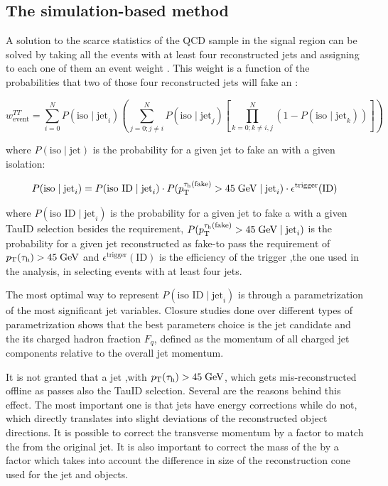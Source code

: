 \subsection{The simulation-based method}
\label{dihad:subsec:eventweight}
\FloatBarrier

A solution to the scarce statistics of the QCD sample in the signal region can be solved by taking all the events with at least four reconstructed jets and assigning to each one of them an event weight . This weight is a function of the probabilities that two of those four reconstructed jets will fake an \hadtau:

\begin{equation}
w^{TT}_{\text{event}} = \sum_{i=0}^{N}P(\text{iso}\mid \text{jet}_{i})\left(\sum_{j=0; j\neq i}^{N}P(\text{iso}\mid \text{jet}_{j})\left[\prod_{k=0; k\neq i,j}^{N}(1-P(\text{iso}\mid \text{jet}_{k}))\right]\right)
\end{equation}

where $P(\text{iso}\mid \text{jet})$ is the probability for a given jet to fake an \hadtau with a given isolation:

\begin{equation}
P(\text{iso}\mid \text{jet}_{i}) = P(\text{iso ID}\mid \text{jet}_{i}) \cdot P(p_{\text{T}}^{\tau_{\text{h}}(\text{fake})} > 45\;\text{Ge}\kern-0.06667em\text{V}\mid \text{jet}_{i}) \cdot  \epsilon^{\text{trigger}}(\text{ID})
\end{equation}

where $P(\text{iso ID}\mid \text{jet}_{i})$ is the probability for a given jet to fake a \hadtau with a given TauID selection besides the \pt requirement, $P(p_{\text{T}}^{\tau_{\text{h}}(\text{fake})} > 45\;\text{Ge}\kern-0.06667em\text{V}\mid \text{jet}_{i})$ is the probability for a given jet reconstructed as fake-\hadtau to pass the requirement of $p_{\text{T}}(\tau_{\text{h}})> 45\;\text{Ge}\kern-0.06667em\text{V}$ and $\epsilon^{\text{trigger}}(\text{ID})$ is the efficiency of the trigger ,the one used in the analysis, in selecting events with at least four jets.

The most optimal way to represent $P(\text{iso ID}\mid \text{jet}_{i})$ is through a parametrization of the most significant jet variables. Closure studies done over different types of parametrization shows that the best parameters choice is the jet candidate \pt and the its charged hadron fraction $F_{q}$, defined as the momentum of all charged jet components relative to the overall jet momentum.

It is not granted that a jet ,with $p_{\text{T}}(\tau_{\text{h}})> 45\;\text{Ge}\kern-0.06667em\text{V}$, which gets mis-reconstructed offline as \hadtau passes also the TauID \pt selection. Several are the reasons behind this effect. The most important one is that jets have energy corrections while \hadtaufake do not, which directly translates into slight deviations of the reconstructed object directions. It is possible to correct the \hadtau transverse momentum by a factor to match the \pt from the original jet. It is also important to correct the mass of the \hadtaufake by a factor which takes into account the difference in size of the reconstruction cone used for the jet and \hadtau objects.

